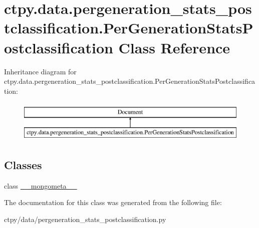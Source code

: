 \hypertarget{classctpy_1_1data_1_1pergeneration__stats__postclassification_1_1_per_generation_stats_postclassification}{\section{ctpy.\-data.\-pergeneration\-\_\-stats\-\_\-postclassification.\-Per\-Generation\-Stats\-Postclassification Class Reference}
\label{classctpy_1_1data_1_1pergeneration__stats__postclassification_1_1_per_generation_stats_postclassification}
}
Inheritance diagram for ctpy.\-data.\-pergeneration\-\_\-stats\-\_\-postclassification.\-Per\-Generation\-Stats\-Postclassification\-:\begin{figure}[H]
\begin{center}
\leavevmode
\includegraphics[height=2.000000cm]{classctpy_1_1data_1_1pergeneration__stats__postclassification_1_1_per_generation_stats_postclassification}
\end{center}
\end{figure}
\subsection*{Classes}
\begin{DoxyCompactItemize}
\item 
class \hyperlink{classctpy_1_1data_1_1pergeneration__stats__postclassification_1_1_per_generation_stats_postclassification_1_1____mongometa____}{\-\_\-\-\_\-mongometa\-\_\-\-\_\-}
\end{DoxyCompactItemize}


The documentation for this class was generated from the following file\-:\begin{DoxyCompactItemize}
\item 
ctpy/data/pergeneration\-\_\-stats\-\_\-postclassification.\-py\end{DoxyCompactItemize}
